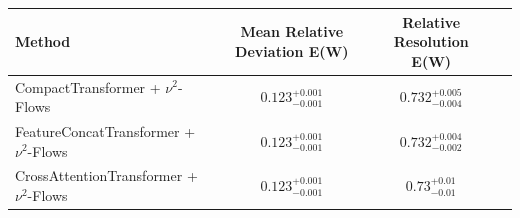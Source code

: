     \begin{tabular}{lccc}
        \toprule
        Method & Mean Relative Deviation E(W) & Relative Resolution E(W) \\
        \midrule
        CompactTransformer + $\nu^2$-Flows & $0.123_{-0.001}^{+0.001}$ & $0.732_{-0.004}^{+0.005}$ \\
        FeatureConcatTransformer + $\nu^2$-Flows & $0.123_{-0.001}^{+0.001}$ & $0.732_{-0.002}^{+0.004}$ \\
        CrossAttentionTransformer + $\nu^2$-Flows & $0.123_{-0.001}^{+0.001}$ & $0.73_{-0.01}^{+0.01}$ \\
        \bottomrule
    \end{tabular}